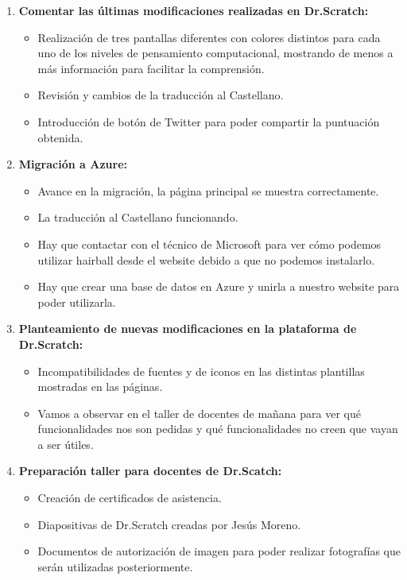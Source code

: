 \documentclass[a4paper,12pt]{letter}
\begin{document}
\begin{letter}
\begin{enumerate}
    
    \item {\textbf {Comentar las últimas modificaciones realizadas en Dr.Scratch:}}
    \begin{itemize}
        \item {Realización de tres pantallas diferentes con colores distintos para cada uno de los niveles de pensamiento computacional, mostrando de menos a más información para facilitar la comprensión.}
        \item {Revisión y cambios de la traducción al Castellano.}
        \item {Introducción de botón de Twitter para poder compartir la puntuación obtenida.}
    \end{itemize}

    \item{\textbf {Migración a Azure:}}
    \begin{itemize}
        \item {Avance en la migración, la página principal se muestra correctamente.}
        \item {La traducción al Castellano funcionando.}
        \item {Hay que contactar con el técnico de Microsoft para ver cómo podemos utilizar hairball desde el website debido a que no podemos instalarlo.}
        \item {Hay que crear una base de datos en Azure y unirla a nuestro website para poder utilizarla.}

    \end{itemize}

	\item{\textbf {Planteamiento de nuevas modificaciones en la plataforma de Dr.Scratch:}}
    \begin{itemize}
        \item {Incompatibilidades de fuentes y de iconos en las distintas plantillas mostradas en las páginas.}
        \item {Vamos a observar en el taller de docentes de mañana para ver qué funcionalidades nos son pedidas y qué funcionalidades no creen que vayan a ser útiles.}
    \end{itemize}

    \item {\textbf {Preparación taller para docentes de Dr.Scatch:}}
        \begin{itemize}
            \item {Creación de certificados de asistencia.}
            \item {Diapositivas de Dr.Scratch creadas por Jesús Moreno.}
            \item {Documentos de autorización de imagen para poder realizar fotografías que serán utilizadas posteriormente.}
        \end{itemize}


\end{enumerate}
\end{letter}
\end{document}
